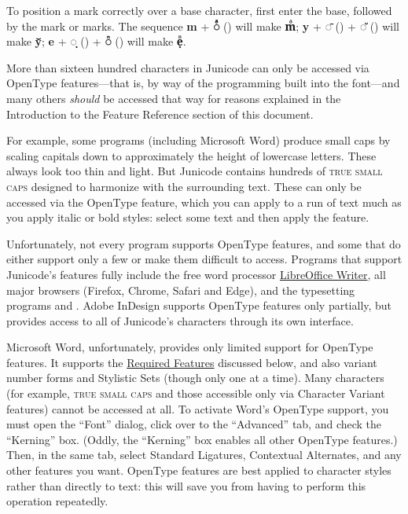 To position a mark correctly over a base character, first enter the base,
followed by the mark or marks.
The sequence \textbf{m} + \textbf{◌ᷙ} ()
will make \textbf{mᷙ}; \textbf{y} + \textbf{◌̄} () + \textbf{◌̆} () will make \textbf{y͏̄̆};
\textbf{e} + \textbf{◌̣} () + \textbf{◌ᷠ} () will make \textbf{ẹᷠ}.

More than sixteen hundred characters in Junicode can only be accessed via OpenType features—that is,
by way of the programming built into the font—and many others \textit{should} be
accessed that way for reasons explained in the Introduction
to the Feature Reference section of this document.

For example, some programs (including Microsoft Word) produce small caps by
scaling capitals down to approximately the height of lowercase letters.
These always look too thin and light.
But Junicode contains hundreds of \textsc{true small caps} designed to harmonize with
the surrounding text. These can only be accessed via the OpenType  feature,
which you can apply to a run of text much as you apply italic or bold styles:
select some text and then apply the feature.

Unfortunately, not every program supports OpenType features, and some that do
either support only a few or make them difficult to access. Programs
that support Junicode’s features fully include the free word processor
\href{https://www.libreoffice.org/}{LibreOffice Writer}, all major browsers
(Firefox, Chrome, Safari and Edge), and
the typesetting programs {\LuaLaTeX} and {\XeLaTeX}. Adobe InDesign supports
OpenType features only partially, but provides access to all of Junicode's characters
through its own interface.

Microsoft Word, unfortunately, provides only limited support for OpenType
features. It supports the \hyperlink{req}{Required Features} discussed below, and also
variant number forms and Stylistic Sets (though only one at a time). Many characters
(for example, \textsc{true small caps} and those accessible only via Character
Variant features) cannot be accessed at all. To activate Word's OpenType
support, you must open the “Font” dialog, click over to the “Advanced” tab,
and check the “Kerning” box. (Oddly, the “Kerning” box enables all other
OpenType features.) Then, in the same tab, select Standard Ligatures, Contextual
Alternates, and any other features you want.
OpenType features are best applied to character styles rather than
directly to text: this will
save you from having to perform this operation repeatedly.

